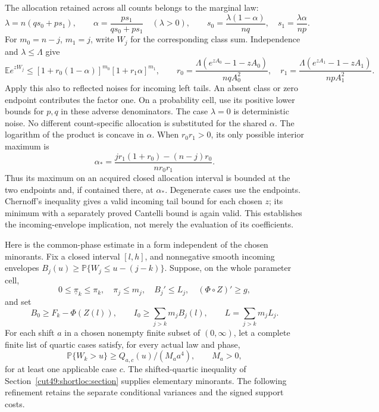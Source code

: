 \documentclass[11pt,a4paper]{article}
\numberwithin{equation}{section}
\theoremstyle{definition}
\theoremstyle{remark}
\newcommand{\E}{\mathbb E}
\newcommand{\Pp}{\mathbb P}
\begin{document}
The allocation retained across all counts belongs to the marginal law:
\[
 \lambda=n(qs_0+ps_1),\qquad
\alpha=\frac{ps_1}{qs_0+ps_1}\quad(\lambda>0),\qquad
 s_0=\frac{\lambda(1-\alpha)}{nq},\quad
 s_1=\frac{\lambda\alpha}{np}.
\]
For \(m_0=n-j\), \(m_1=j\), write \(W_j\) for the corresponding
class sum. Independence and \(\lambda\le\Lambda\) give
\[
 \E e^{zW_j}\le
 [1+r_0(1-\alpha)]^{m_0}[1+r_1\alpha]^{m_1},\qquad
 r_0=\frac{\Lambda(e^{zA_0}-1-zA_0)}{nqA_0^2},\quad
 r_1=\frac{\Lambda(e^{zA_1}-1-zA_1)}{npA_1^2}.
\]
Apply this also to reflected noises for incoming left tails.
An absent class or zero endpoint contributes the factor one.
On a probability cell, use its positive lower bounds for \(p,q\)
in these adverse denominators. The case \(\lambda=0\) is deterministic
noise. No different count-specific allocation is substituted for
the shared \(\alpha\).
The logarithm of the product is concave in \(\alpha\).
When \(r_0r_1>0\), its only possible interior maximum is
\[
 \alpha_*=
 \frac{j r_1(1+r_0)-(n-j)r_0}{n r_0r_1}.
\]
Thus its maximum on an acquired closed allocation interval is
bounded at the two endpoints and, if contained there, at
\(\alpha_*\). Degenerate cases use the endpoints.
Chernoff's inequality gives a valid incoming tail bound for each
chosen \(z\); its minimum with a separately proved Cantelli bound
is again valid. This establishes the incoming-envelope implication,
not merely the evaluation of its coefficients.

Here is the common-phase estimate in a form independent of the
chosen minorants. Fix a closed interval \([l,h]\), and nonnegative
smooth incoming envelopes \(B_j(u)\ge\Pp\{W_j\le u-(j-k)\}\).
Suppose, on the whole parameter cell,
\[
 0\le\underline\pi_k\le\pi_k,\quad \pi_j\le m_j,\quad
 B_j'\le L_j,\quad (\Phi\circ Z)'\ge g,
\]
and set
\[
 B_0\ge F_k-\Phi(Z(l)),\qquad
 I_0\ge\sum_{j>k}m_jB_j(l),\qquad L=\sum_{j>k}m_jL_j.
\]
For each shift \(a\) in a chosen nonempty finite subset of \((0,\infty)\),
let a complete finite list of
quartic cases satisfy, for every actual law and phase,
\[
 \Pp\{W_k>u\}\ge Q_{a,c}(u)/(M_a a^4),\qquad M_a>0,
\]
for at least one applicable case \(c\).
The shifted-quartic inequality of
Section~\ref{cut49:shortloc:section} supplies elementary minorants.
The following refinement retains the separate conditional variances
and the signed support costs.
\end{document}
